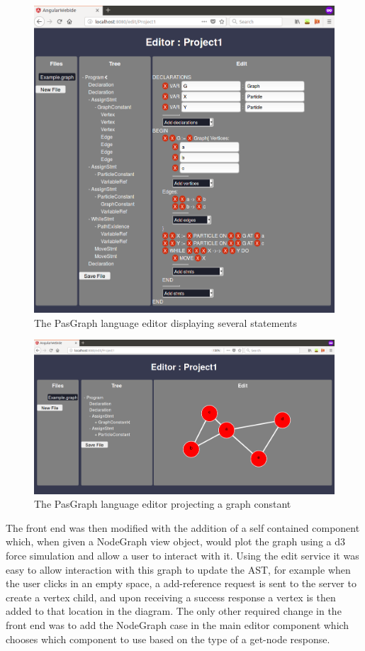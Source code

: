 \documentclass{article}
\begin{document}
\begin{figure}[h!]
  \centering
  \includegraphics[width=\linewidth]{./Screenshots/graphUI25Narrow.png}
  \caption{The PasGraph language editor displaying several statements}
  \label{fig:pasgraphUI1}
\end{figure}
\begin{figure}[h!]
  \centering
  \includegraphics[width=\linewidth]{./Screenshots/graphUIgraph2narrow.png}
  \caption{The PasGraph language editor projecting a graph constant}
  \label{fig:pasgraphUI2}
\end{figure}
The front end was then modified with the addition of a self contained component which, when given a NodeGraph view object, would plot the graph using a d3 force simulation and allow a user to interact with it. Using the edit service it was easy to allow interaction with this graph to update the AST, for example when the user clicks in an empty space, a add-reference request is sent to the server to create a vertex child, and upon receiving a success response a vertex is then added to that location in the diagram. The only other required change in the front end was to add the NodeGraph case in the main editor component which chooses which component to use based on the type of a get-node response.
\end{document}
